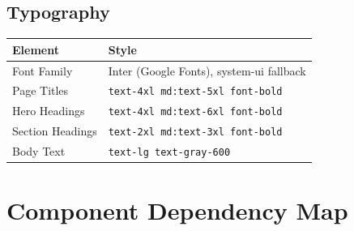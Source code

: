 \documentclass[11pt,a4paper]{article}
\begin{document}
\subsection{Typography}

\begin{tabularx}{\textwidth}{lX}
\toprule
\textbf{Element} & \textbf{Style} \\
\midrule
Font Family & Inter (Google Fonts), system-ui fallback \\
Page Titles & \texttt{text-4xl md:text-5xl font-bold} \\
Hero Headings & \texttt{text-4xl md:text-6xl font-bold} \\
Section Headings & \texttt{text-2xl md:text-3xl font-bold} \\
Body Text & \texttt{text-lg text-gray-600} \\
\bottomrule
\end{tabularx}

\newpage

\section{Component Dependency Map}
\end{document}
